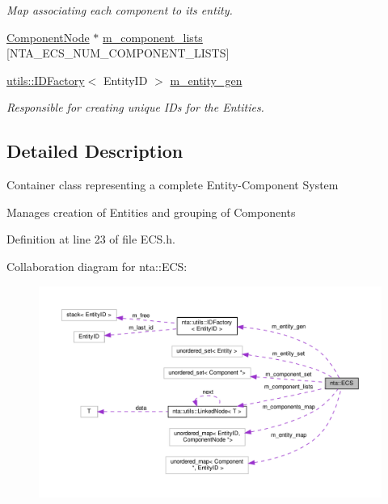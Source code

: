 \begin{DoxyCompactItemize}
\begin{DoxyCompactList}\small\item\em Map associating each component to its entity. \end{DoxyCompactList}\item 
\hyperlink{structnta_1_1utils_1_1LinkedNode}{Component\+Node} $\ast$ \hyperlink{classnta_1_1ECS_a2d45b9e54bcc636faac7cbb403b478bd}{m\+\_\+component\+\_\+lists} \mbox{[}N\+T\+A\+\_\+\+E\+C\+S\+\_\+\+N\+U\+M\+\_\+\+C\+O\+M\+P\+O\+N\+E\+N\+T\+\_\+\+L\+I\+S\+TS\mbox{]}
\item 
\mbox{\label{classnta_1_1ECS_a8c2683281c1f6bfdc2765cca5059c8af}} 
\hyperlink{classnta_1_1utils_1_1IDFactory}{utils\+::\+I\+D\+Factory}$<$ Entity\+ID $>$ \hyperlink{classnta_1_1ECS_a8c2683281c1f6bfdc2765cca5059c8af}{m\+\_\+entity\+\_\+gen}
\begin{DoxyCompactList}\small\item\em Responsible for creating unique I\+Ds for the Entities. \end{DoxyCompactList}\end{DoxyCompactItemize}


\subsection{Detailed Description}
Container class representing a complete Entity-\/\+Component System

Manages creation of Entities and grouping of Components 

Definition at line 23 of file E\+C\+S.\+h.



Collaboration diagram for nta\+:\+:E\+CS\+:
\nopagebreak
\begin{figure}[H]
\begin{center}
\leavevmode
\includegraphics[width=350pt]{d5/d5c/classnta_1_1ECS__coll__graph}
\end{center}
\end{figure}


